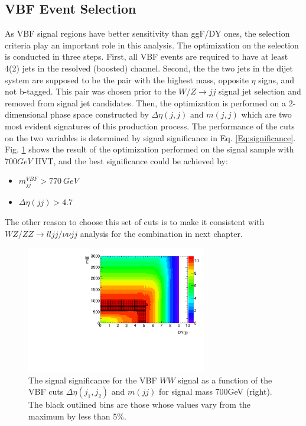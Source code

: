 \subsection{VBF Event Selection}
As VBF signal regions have better sensitivity than ggF/DY ones, the selection criteria play an important role in this analysis. The optimization on the selection is conducted in three steps. First, all VBF events are required to have at least 4(2) jets in the resolved (boosted) channel. Second, the the two jets in the dijet system are supposed to be the pair with the highest mass, opposite $\eta$ signs, and not b-tagged. This pair was chosen prior to the $W/Z\rightarrow jj$ signal jet selection and removed from signal jet candidates. Then, the optimization is performed on a 2-dimensional phase space constructed by $\Delta\eta(j,j)$ and $m(j,j)$ which are two most evident signatures of this production process. The performance of the cuts on the two variables is determined by signal significance in Eq. \ref{Eq:significance}. Fig. \ref{Fig:VBFOptimization} shows the result of the optimization performed on the signal sample with $700GeV$ HVT, and the best significance could be achieved by:
\begin{itemize}
	\item {\bf $m_{jj}^{VBF}> 770~GeV$}
	\item {\bf $\Delta\eta(jj)>4.7$}
\end{itemize}
The other reason to choose this set of cuts is to make it consistent with $WZ/ZZ \rightarrow lljj/\nu\nu jj$ analysis for the combination in next chapter. 
\begin{figure}[h]
	\centering
	\includegraphics[width=0.7\textwidth]{Chapter3/VBF700_SignfSpace}
	\caption{The signal significance for the VBF $WW$ signal as a function of the VBF cuts $\Delta \eta(j_1,j_2)$ and $m(jj)$ for signal mass 700GeV (right). The black outlined bins are those whose values vary from the maximum by less than 5\%.}
	\label{Fig:VBFOptimization}
\end{figure}

